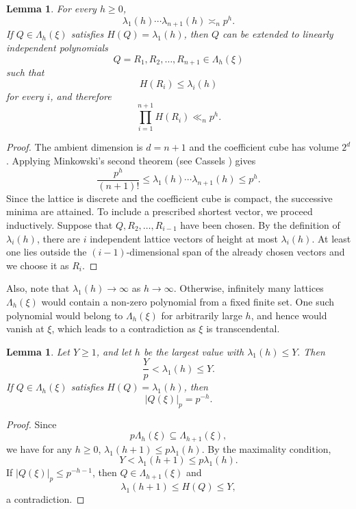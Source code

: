 \documentclass[12pt,reqno]{amsart}
\newtheorem{lemma}[theorem]{Lemma}
\theoremstyle{definition}
\theoremstyle{remark}
\begin{document}
\begin{lemma}\label{lem:lattice-minima}
For every $h\geq0$,
$$
\lambda_1(h)\cdots\lambda_{n+1}(h)\asymp_n p^h.
$$
If $Q\in\Lambda_h(\xi)$ satisfies $H(Q)=\lambda_1(h)$, then $Q$ can be extended to linearly independent polynomials
$$
Q=R_1,R_2,\ldots,R_{n+1}\in\Lambda_h(\xi)
$$
such that
$$
H(R_i)\leq\lambda_i(h)
$$
for every $i$, and therefore
$$
\prod_{i=1}^{n+1}H(R_i)\ll_n p^h.
$$
\end{lemma}

\begin{proof}
The ambient dimension is $d=n+1$ and the coefficient cube has volume $2^d$.
Applying Minkowski's second theorem (see Cassels
\cite[Chapter~VIII]{Cassels}) gives
$$
\frac{p^h}{(n+1)!}
\leq
\lambda_1(h)\cdots\lambda_{n+1}(h)
\leq
p^h.
$$
Since the lattice is discrete and the coefficient cube is compact, the successive minima are attained. To include a prescribed shortest vector, we proceed inductively. Suppose that $Q,R_2,\ldots,R_{i-1}$ have been chosen. By the definition of $\lambda_i(h)$, there are $i$ independent lattice vectors of height at most $\lambda_i(h)$. At least one lies outside the $(i-1)$-dimensional span of the already chosen vectors and we choose it as $R_i$.
\end{proof}

Also, note that $\lambda_1(h)\longrightarrow\infty$ as $h\to\infty$. Otherwise, infinitely many lattices $\Lambda_h(\xi)$ would contain a non-zero polynomial from a fixed finite set. One such polynomial would belong to $\Lambda_h(\xi)$ for arbitrarily large $h$, and hence would vanish at $\xi$, which leads to a contradiction as $\xi$ is transcendental. 

\begin{lemma}\label{lem:shortest-vector}
Let $Y\geq1$, and let $h$ be the largest value with $\lambda_1(h)\leq Y.$ Then
$$
\frac{Y}{p}<\lambda_1(h)\leq Y.
$$
If $Q\in\Lambda_h(\xi)$ satisfies $H(Q)=\lambda_1(h)$, then
$$
|Q(\xi)|_p=p^{-h}.
$$
\end{lemma}

\begin{proof}
Since
$$
p\Lambda_h(\xi)\subseteq\Lambda_{h+1}(\xi),
$$
we have for any $h\geq 0$, $\lambda_1(h+1)\leq p\lambda_1(h)$. By the maximality condition,
$$
Y<\lambda_1(h+1)\leq p\lambda_1(h).
$$
If $|Q(\xi)|_p\leq p^{-h-1}$, then $Q\in\Lambda_{h+1}(\xi)$ and
$$
\lambda_1(h+1)\leq H(Q)\leq Y,
$$
a contradiction.
\end{proof}
\medskip

\end{document}
